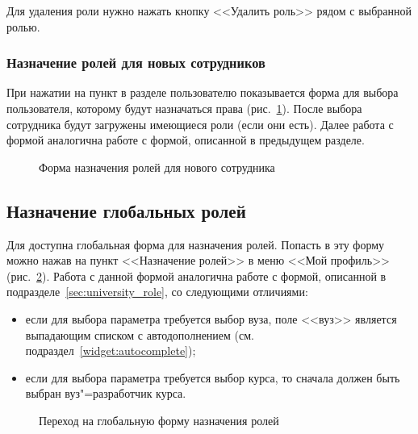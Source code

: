 Для удаления роли нужно нажать кнопку <<Удалить роль>> рядом с выбранной ролью.


\subsubsection{Назначение ролей для новых сотрудников}

При нажатии на пункт  в разделе  пользователю показывается форма для выбора пользователя,
которому будут назначаться права (рис.~\ref{img:employee:choose_user_form}). После выбора сотрудника будут загружены имеющиеся роли (если они есть).
Далее работа с формой аналогична работе с формой, описанной в предыдущем разделе.

\begin{figure}[H]
	\caption{Форма назначения ролей для нового сотрудника}
	\label{img:employee:choose_user_form}
\end{figure}

\subsection{Назначение глобальных ролей} \label{sec:global_role}

Для  доступна глобальная форма для назначения ролей. Попасть в эту форму можно нажав на пункт <<Назначение ролей>> в
меню <<Мой профиль>> (рис.~\ref{img:employee:global_perms_menu}). Работа с данной формой аналогична работе с формой, описанной в 
подразделе~\ref{sec:university_role}, со следующими отличиями:
\begin{itemize}
	\item если для выбора параметра требуется выбор вуза, поле <<вуз>> является выпадающим списком с 
	автодополнением (см. подраздел~\ref{widget:autocomplete});
	\item если для выбора параметра требуется выбор курса, то сначала должен быть выбран вуз"=разработчик курса.
\end{itemize}

\begin{figure}[H]
	\caption{Переход на глобальную форму назначения ролей}
	\label{img:employee:global_perms_menu}
\end{figure}

